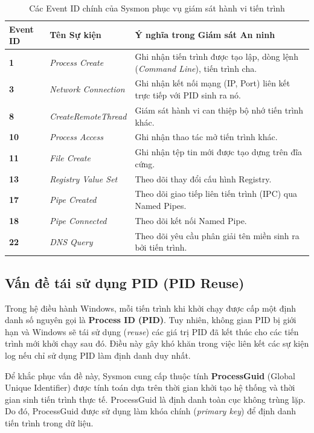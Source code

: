 \documentclass[../main.tex]{subfiles}
\begin{document}
\begin{table}[H]
\centering
\small
\setlength{\tabcolsep}{4pt}
\caption{Các Event ID chính của Sysmon phục vụ giám sát hành vi tiến trình}
\label{tab:sysmon_eids}
\begin{tabular}{|>{\centering\arraybackslash}p{1.8cm}|p{3.2cm}|p{8.0cm}|}
\hline
\textbf{Event ID} & \textbf{Tên Sự kiện} & \textbf{Ý nghĩa trong Giám sát An ninh} \\ \hline
\textbf{1} & \textit{Process Create} & Ghi nhận tiến trình được tạo lập, dòng lệnh (\textit{Command Line}), tiến trình cha. \\ \hline
\textbf{3} & \textit{Network Connection} & Ghi nhận kết nối mạng (IP, Port) liên kết trực tiếp với PID sinh ra nó. \\ \hline
\textbf{8} & \textit{CreateRemoteThread} & Giám sát hành vi can thiệp bộ nhớ tiến trình khác. \\ \hline
\textbf{10} & \textit{Process Access} & Ghi nhận thao tác mở tiến trình khác. \\ \hline
\textbf{11} & \textit{File Create} & Ghi nhận tệp tin mới được tạo dựng trên đĩa cứng. \\ \hline
\textbf{13} & \textit{Registry Value Set} & Theo dõi thay đổi cấu hình Registry. \\ \hline
\textbf{17} & \textit{Pipe Created} & Theo dõi giao tiếp liên tiến trình (IPC) qua Named Pipes. \\ \hline
\textbf{18} & \textit{Pipe Connected} & Theo dõi kết nối Named Pipe. \\ \hline
\textbf{22} & \textit{DNS Query} & Theo dõi yêu cầu phân giải tên miền sinh ra bởi tiến trình. \\ \hline
\end{tabular}
\end{table}

\subsection{Vấn đề tái sử dụng PID (PID Reuse)}
\label{subsection:1.1.1}
Trong hệ điều hành Windows, mỗi tiến trình khi khởi chạy được cấp một định danh số nguyên gọi là \textbf{Process ID (PID)}. Tuy nhiên, không gian PID bị giới hạn và Windows sẽ tái sử dụng (\textit{reuse}) các giá trị PID đã kết thúc cho các tiến trình mới khởi chạy sau đó. Điều này gây khó khăn trong việc liên kết các sự kiện log nếu chỉ sử dụng PID làm định danh duy nhất.

Để khắc phục vấn đề này, Sysmon cung cấp thuộc tính \textbf{ProcessGuid} (Global Unique Identifier) được tính toán dựa trên thời gian khởi tạo hệ thống và thời gian sinh tiến trình thực tế. ProcessGuid là định danh toàn cục không trùng lặp. Do đó, ProcessGuid được sử dụng làm khóa chính (\textit{primary key}) để định danh tiến trình trong dữ liệu.
\end{document}
